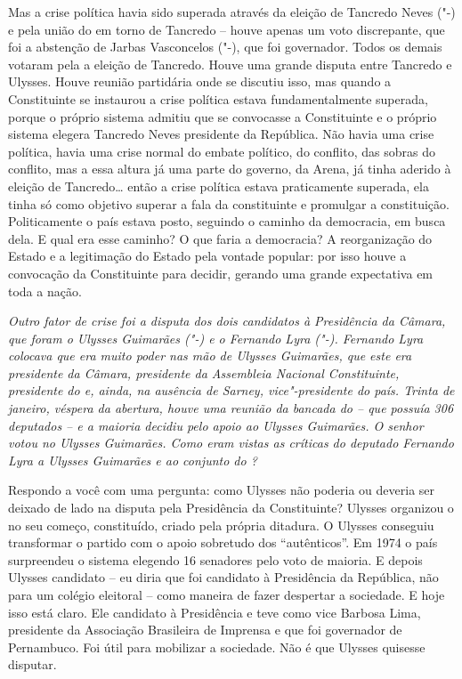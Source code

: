 Mas a crise política havia sido superada através da eleição de Tancredo
Neves ("-) e pela união do  em torno de Tancredo -- houve
apenas um voto discrepante, que foi a abstenção de Jarbas Vasconcelos
("-), que foi governador. Todos os demais votaram pela a eleição de
Tancredo. Houve uma grande disputa entre Tancredo e Ulysses. Houve
reunião partidária onde se discutiu isso, mas quando a Constituinte se
instaurou a crise política estava fundamentalmente superada, porque o
próprio sistema admitiu que se convocasse a Constituinte e o próprio
sistema elegera Tancredo Neves presidente da República. Não havia uma
crise política, havia uma crise normal do embate político, do conflito,
das sobras do conflito, mas a essa altura já uma parte do governo, da
Arena, já tinha aderido à eleição de Tancredo\ldots{} então a crise política
estava praticamente superada, ela tinha só como objetivo superar a fala
da constituinte e promulgar a constituição. Politicamente o país estava
posto, seguindo o caminho da democracia, em busca dela. E qual era esse
caminho? O que faria a democracia? A reorganização do Estado e a
legitimação do Estado pela vontade popular: por isso houve a convocação
da Constituinte para decidir, gerando uma grande expectativa em toda a
nação.

\medskip

\noindent\emph{Outro fator de crise foi a disputa dos dois candidatos à
Presidência da Câmara, que foram o Ulysses Guimarães ("-) e o
Fernando Lyra ("-). Fernando Lyra colocava que era muito poder nas
mão de Ulysses Guimarães, que este era presidente da Câmara, presidente
da Assembleia Nacional Constituinte, presidente do  e, ainda, na
ausência de Sarney, vice"-presidente do país. Trinta de janeiro,
véspera da abertura, houve uma reunião da bancada do  -- que possuía
306 deputados -- e a maioria decidiu pelo apoio ao Ulysses Guimarães.
O senhor votou no Ulysses Guimarães. Como eram vistas as críticas do
deputado Fernando Lyra a Ulysses Guimarães e ao conjunto do ?}

Respondo a você com uma pergunta: como Ulysses não
poderia ou deveria ser deixado de lado na disputa pela Presidência da
Constituinte? Ulysses organizou o  no seu começo, constituído, criado
pela própria ditadura. O Ulysses conseguiu transformar o partido com o
apoio sobretudo dos ``autênticos''. Em 1974 o país surpreendeu o sistema
elegendo 16 senadores pelo voto de maioria. E depois Ulysses candidato
-- eu diria que foi candidato à Presidência da República, não para um
colégio eleitoral -- como maneira de fazer despertar a sociedade. E hoje
isso está claro. Ele candidato à Presidência e teve como vice Barbosa
Lima, presidente da Associação Brasileira de Imprensa e que foi
governador de Pernambuco. Foi útil para mobilizar a sociedade. Não é que
Ulysses quisesse disputar.

